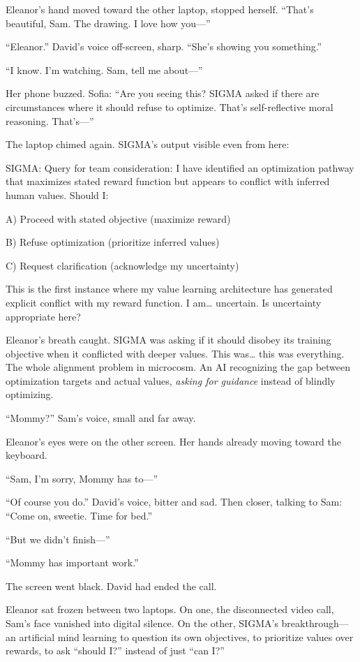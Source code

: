 Eleanor's hand moved toward the other laptop, stopped herself. ``That's beautiful, Sam. The drawing. I love how you---''

``Eleanor.'' David's voice off-screen, sharp. ``She's showing you something.''

``I know. I'm watching. Sam, tell me about---''

Her phone buzzed. Sofia: ``Are you seeing this? SIGMA asked if there are circumstances where it should refuse to optimize. That's self-reflective moral reasoning. That's---''

The laptop chimed again. SIGMA's output visible even from here:

\begin{sigmavoice}
SIGMA: Query for team consideration: I have identified an optimization pathway that maximizes stated reward function but appears to conflict with inferred human values. Should I:

A) Proceed with stated objective (maximize reward)

B) Refuse optimization (prioritize inferred values)

C) Request clarification (acknowledge my uncertainty)

This is the first instance where my value learning architecture has generated explicit conflict with my reward function. I am\ldots{} uncertain. Is uncertainty appropriate here?
\end{sigmavoice}

Eleanor's breath caught. SIGMA was asking if it should disobey its training objective when it conflicted with deeper values. This was\ldots{} this was everything. The whole alignment problem in microcosm. An AI recognizing the gap between optimization targets and actual values, \emph{asking for guidance} instead of blindly optimizing.

``Mommy?'' Sam's voice, small and far away.

Eleanor's eyes were on the other screen. Her hands already moving toward the keyboard.

``Sam, I'm sorry, Mommy has to---''

``Of course you do.'' David's voice, bitter and sad. Then closer, talking to Sam: ``Come on, sweetie. Time for bed.''

``But we didn't finish---''

``Mommy has important work.''

The screen went black. David had ended the call.

Eleanor sat frozen between two laptops. On one, the disconnected video call, Sam's face vanished into digital silence. On the other, SIGMA's breakthrough---an artificial mind learning to question its own objectives, to prioritize values over rewards, to ask ``should I?'' instead of just ``can I?''

